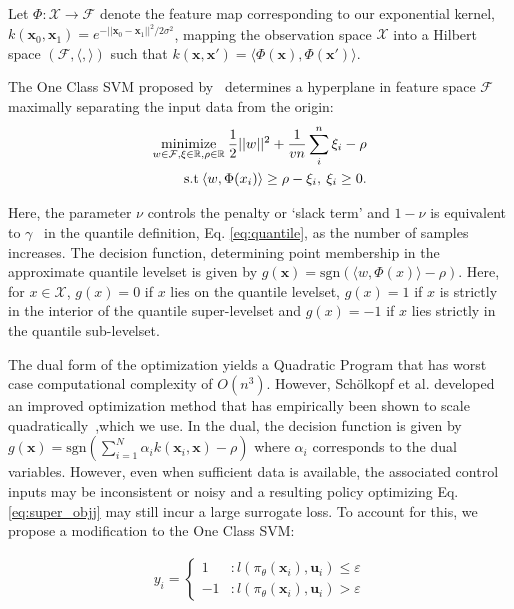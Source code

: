 \documentclass[10pt, conference]{ieeeconf}      %
\newcommand{\bu}{\mathbf{u}}
\newcommand{\bx}{\mathbf{x}}
\begin{document}
Let $\Phi:\mathcal{X}\to \mathcal{F}$ denote the feature map corresponding to our exponential kernel, $k(\bx_0,\bx_1) = e^{-||\bx_0 - \bx_1||^2/2\sigma^2}$, mapping the
observation space $\mathcal{X}$ into a Hilbert space $(\mathcal{F}, \langle, \rangle)$ such that $k(\bx, \bx') = \langle
\Phi(\bx), \Phi(\bx')\rangle$.

The One Class SVM proposed by~\cite{scholkopf2001estimating} determines a hyperplane in feature space $\mathcal{F}$
maximally separating the input data from the origin:
\vspace{-2ex}
\begin{align}\label{eq:primal_sup}
    \underset{w\in \mathcal{F}, \mathbf{\xi} \in \mathbb{R}, \rho \in \mathbb{R}}{\mbox{minimize}}\: \frac{1}{2}||w||^2+\frac{1}{vn} \sum^n_i \xi_i - \rho\\
\mbox{s.t} \: \langle w,\Phi(x_i) \rangle \geq \rho - \xi_i, \: \xi_i \geq 0 \notag.
\end{align}

Here, the parameter $\nu$ controls the penalty or `slack term' and $1-\nu$ is equivalent to $\gamma$~\cite{vert2006consistency}
in the quantile definition, Eq. \ref{eq:quantile}, as the number of samples increases. The decision
function, determining point membership in the approximate quantile levelset is given by $g(\bx) = \mbox{sgn}(\langle w,\Phi(x) \rangle-\rho)$. Here, for $x\in \mathcal{X}$, $g(x)=0$ if $x$ lies on the quantile levelset,
$g(x) = 1$ if $x$ is strictly in the interior of the quantile super-levelset and $g(x) = -1$ 
if $x$ lies strictly in the quantile sub-levelset. 



The dual form of the optimization yields a Quadratic Program 
that has worst case computational complexity of $O(n^3)$. However, Sch{\"o}lkopf et al. developed an improved optimization method that has empirically been shown to scale quadratically~\cite{scholkopf2001estimating},which we use. In the dual, the decision function is given by $g(\bx) = \mbox{sgn}(\sum^N_{i=1}\alpha_i k(\bx_i,\bx)-\rho)$ where $\alpha_i$ corresponds to the dual variables. 
However, even when sufficient data is available, the associated control inputs may be inconsistent or noisy and a resulting policy
optimizing Eq. \ref{eq:super_objj} may still incur a large surrogate loss. To account for this, we propose a
modification to the One Class SVM:

\vspace{-2ex}
\begin{align}
y_i = \left\{
     \begin{array}{lr}
         1 & : l(\pi_{\theta}(\bx_i),\bu_i)\le \varepsilon\\
         -1 & : l(\pi_{\theta}(\bx_i),\bu_i)>\varepsilon
     \end{array}
   \right.
\end{align}
\end{document}
